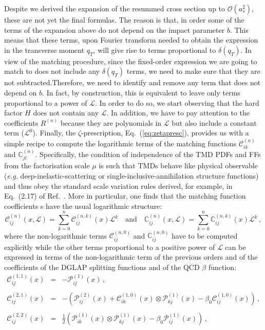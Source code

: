 \documentclass[10pt,a4paper]{article}
\begin{document}
Despite we derived the expansion of the resummed cross section up to
$\mathcal{O}(a_s^2)$, these are not yet the final formulas. The reason
is that, in order some of the terms of the expansion above do not
depend on the impact parameter $b$. This means that these terms, upon
Fourier transform needed to obtain the expression in the transverse
moment $q_T$, will give rise to terms proportional to
$\delta(q_T)$. In view of the matching procedure, since the
fixed-order expression we are going to match to does not include any
$\delta(q_T)$ terms, we need to make sure that they are not
subtracted.Therefore, we need to identify and remove any term that
does not depend on $b$. In fact, by construction, this is equivalent
to leave only terms proportional to a power of $\mathcal{L}$. In order
to do so, we start observing that the hard factor $H$ does not contain
any $\mathcal{L}$. In addition, we have to pay attention to the
coefficients $R^{(n)}$ because they are polynomials in $\mathcal{L}$
but also include a constant term ($\mathcal{L}^0$). Finally, the
$\zeta$-prescription, Eq.~(\ref{eq:zetapresc}), provides us with a
simple recipe to compute the logarithmic terms of the matching
functions $\mathcal{C}_{ik}^{(n)}$ and
$\mathbb{C}_{jl}^{(n)}$. Specifically, the condition of independence
of the TMD PDFs and FFs from the factorisation scale $\mu$ is such
that TMDs behave like physical observable (\textit{e.g.}
deep-inelastic-scattering or single-inclusive-annihilation structure
functions) and thus obey the standard scale variation rules derived,
for example, in Eq.~(2.17) of Ref.~\cite{vanNeerven:2000uj}. More in
particular, one finds that the matching function coefficients s have
the usual logarithmic structure:
\begin{equation}
\mathcal{C}_{ij}^{(n)}(x,\mathcal{L}) =
\sum_{k=0}^{n}\mathcal{C}_{ij}^{(n,k)}(x)\mathcal{L}^k\quad\mbox{and}\quad \mathbb{C}_{ij}^{(n)}(x,\mathcal{L}) = \sum_{k=0}^{n}\mathbb{C}_{ij}^{(n,k)}(x)\mathcal{L}^k \,,
\end{equation}
where the non-logarithmic terms $\mathcal{C}_{ij}^{(n,0)}$ and
$\mathbb{C}_{ij}^{(n,0)}$ have to be computed explicitly while the
other terms proportional to a positive power of $\mathcal{L}$ can be
expressed in terms of the non-logarithmic term of the previous orders
and of the coefficients of the DGLAP splitting functions and of the
QCD $\beta$ function:
\begin{equation}
\begin{array}{rcl}
  \mathcal{C}_{ij}^{(1,1)}(x) &=& -\mathcal{P}_{ij}^{(1)}(x) \,,\\
  \\
  \mathcal{C}_{ij}^{(2,1)}(x) &=& -\left(\mathcal{P}_{ij}^{(2)}(x)+\mathcal{C}_{ik}^{(1,0)}(x)
                                  \otimes
                                  \mathcal{P}_{kj}^{(1)}(x)-\beta_0
                                  \mathcal{C}_{ij}^{(1,0)}(x) \right)\,,\\
  \\
  \mathcal{C}_{ij}^{(2,2)}(x) &=&\displaystyle
                                  \frac12\left(\mathcal{P}_{ik}^{(1)}(x)\otimes \mathcal{P}_{kj}^{(1)}(x)-\beta_0 \mathcal{P}_{ij}^{(1)}(x)\right)\,,\\
\end{array}
\end{equation}
\end{document}
